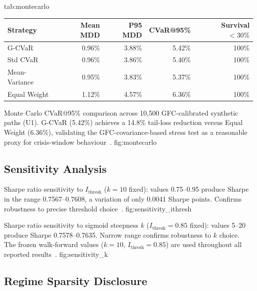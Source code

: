   {tab:montecarlo}
  {\begin{tabular}{lrrrr}
  \toprule
  Strategy & Mean MDD & P95 MDD & CVaR@95\% & Survival $<30\%$ \\
  \midrule
  G-CVaR       & 0.96\% & 3.88\% & 5.42\% & 100\% \\
  Std CVaR     & 0.96\% & 3.86\% & 5.40\% & 100\% \\
  Mean-Variance& 0.95\% & 3.83\% & 5.37\% & 100\% \\
  Equal Weight & 1.12\% & 4.57\% & 6.36\% & 100\% \\
  \bottomrule
  \end{tabular}}

  {Monte Carlo CVaR@95\% comparison across 10,500 GFC-calibrated
   synthetic paths (U1). G-CVaR (5.42\%) achieves a 14.8\%
   tail-loss reduction versus Equal Weight (6.36\%), validating
   the GFC-covariance-based stress test as a reasonable proxy for
   crisis-window behaviour~\citep{glasserman2004,cont2001}.}
  {fig:montecarlo}

\subsection{Sensitivity Analysis}

  {Sharpe ratio sensitivity to $I_{\text{thresh}}$ ($k=10$ fixed):
   values 0.75--0.95 produce Sharpe in the range 0.7567--0.7608,
   a variation of only 0.0041 Sharpe points. Confirms robustness
   to precise threshold choice~\citep{kolm2014,harvey2016}.}
  {fig:sensitivity_ithresh}

  {Sharpe ratio sensitivity to sigmoid steepness $k$ ($I_{\text{thresh}}
   = 0.85$ fixed): values 5--20 produce Sharpe 0.7578--0.7635.
   Narrow range confirms robustness to $k$ choice. The frozen
   walk-forward values ($k=10$, $I_{\text{thresh}}=0.85$) are used
   throughout all reported results~\citep{white2000,harvey2016}.}
  {fig:sensitivity_k}

\subsection{Regime Sparsity Disclosure}

